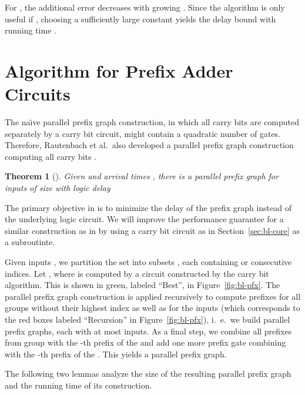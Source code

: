 \documentclass[11pt,final,microtype]{scrartcl}
\theoremstyle{plain}
\newtheorem{theorem}{Theorem}[section]
\theoremstyle{definition}
\theoremstyle{remark}
\newcommand{\tikzfigs}[3]{
  \begin{figure}[!tb]\centering{\resizebox{#2\linewidth}{!}{\begin{tikzpicture}
          
        \end{tikzpicture}}\caption{#1}\label{fig:#3}}\end{figure}}
\begin{document}
For , the additional error decreases with growing . Since the algorithm
is only useful if , choosing a sufficiently large constant
 yields the delay bound  with running time . 

\section{Algorithm for Prefix Adder Circuits}\label{sec:bl-adder}
The na\"{\i}ve parallel prefix graph construction, in which all carry
bits are computed separately by a carry bit circuit, might contain a quadratic
number of gates. Therefore, Rautenbach et al.\  also developed a parallel prefix graph construction
computing all carry bits \cite{bonn2}.

\begin{theorem}[{\cite{bonn2}}] \label{thm:bl-ppfx} Given  and arrival times , there is a
  parallel prefix graph for  inputs of size  with logic delay 
\end{theorem}

The primary objective in \cite{bonn2} is to minimize the delay of the
prefix graph instead of the underlying logic circuit.  We will improve
the performance guarantee for a similar construction as in
\cite{bonn2} by using a carry bit circuit as in
Section~\ref{sec:bl-core} as a subroutinte.

Given inputs , we partition the set 
into  subsets , each containing
 or  consecutive indices. Let ,
where  is computed by a circuit constructed by the carry bit
algorithm. This is shown in green, labeled ``Best'', in
Figure~\ref{fig:bl-pfx}. The parallel prefix graph construction is
applied recursively to compute prefixes for all groups without their
highest index as well as for the  inputs 
(which corresponds to the red boxes labeled ``Recursion'' in
Figure~\ref{fig:bl-pfx}), i.\ e.\ we build  parallel prefix
graphs, each with at most  inputs. As a final step, we combine
all prefixes from group  with the -th prefix of the 
and add one more prefix gate combining  with the -th
prefix of the . This yields a parallel prefix graph.

\tikzfigs{Prefix graph construction}{0.8}{bl-pfx}

The following two lemmas analyze the size of the resulting parallel prefix graph
and the running time of its construction.
\end{document}
